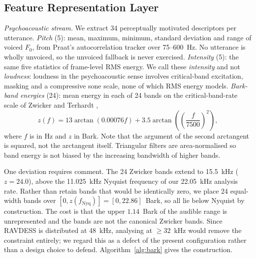 \documentclass[journal,onecolumn,11pt,draftclsnofoot]{IEEEtran}   %
\begin{document}
\subsection{Feature Representation Layer}
\label{sec:features}

\emph{Psychoacoustic stream.} We extract 34 perceptually motivated descriptors
per utterance. \emph{Pitch} (5): mean, maximum, minimum, standard deviation and
range of voiced $F_0$, from Praat's autocorrelation tracker over 75--600~Hz. No
utterance is wholly unvoiced, so the unvoiced fallback is never exercised.
\emph{Intensity} (5): the same five statistics of frame-level RMS energy. We
call these \emph{intensity} and not \emph{loudness}: loudness in the
psychoacoustic sense \cite{iso532} involves critical-band excitation, masking
and a compressive sone scale, none of which RMS energy models. \emph{Bark-band
energies} (24): mean energy in each of 24 bands on the critical-band-rate scale
of Zwicker and Terhardt \cite{zwicker1980analytical},
\begin{equation}
  z(f) = 13\arctan(0.00076 f)
       + 3.5\arctan\!\left(\left(\frac{f}{7500}\right)^{\!2}\right),
  \label{eq:bark}
\end{equation}
where $f$ is in Hz and $z$ in Bark. Note that the argument of the second
arctangent is squared, not the arctangent itself. Triangular filters are
area-normalised so band energy is not biased by the increasing bandwidth of
higher bands.

One deviation requires comment. The 24 Zwicker bands extend to 15.5~kHz
($z = 24.0$), above the 11.025~kHz Nyquist frequency of our 22.05~kHz analysis
rate. Rather than retain bands that would be identically zero, we place 24
equal-width bands over $[0, z(f_{\mathrm{Nyq}})] = [0, 22.86]$~Bark, so all lie
below Nyquist by construction. The cost is that the upper $1.14$~Bark of the
audible range is unrepresented and the bands are not the canonical Zwicker
bands. Since RAVDESS is distributed at 48~kHz, analysing at $\geq 32$~kHz would
remove the constraint entirely; we regard this as a defect of the present
configuration rather than a design choice to defend.
Algorithm~\ref{alg:bark} gives the construction.
\end{document}
